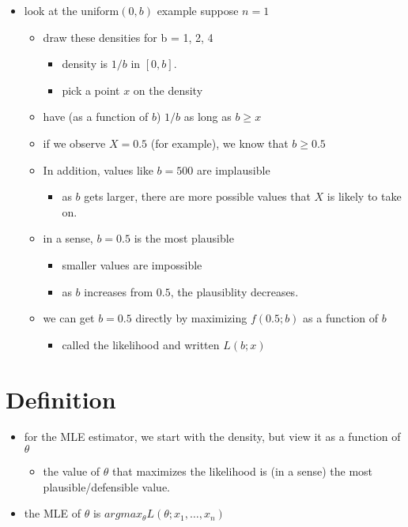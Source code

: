 \begin{itemize}
\item look at the uniform$(0,b)$ example suppose $n = 1$
\begin{itemize}
\item draw these densities for b = 1, 2, 4
\begin{itemize}
\item density is $1/b$ in $[0,b]$.
\item pick a point $x$ on the density
\end{itemize}
\item have (as a function of $b$) $1/b$ as long as $b \geq x$
\item if we observe $X = 0.5$ (for example), we know that $b \geq 0.5$
\item In addition, values like $b = 500$ are implausible
\begin{itemize}
\item as $b$ gets larger, there are more possible values that $X$ is
         likely to take on.
\end{itemize}
\item in a sense, $b = 0.5$ is the most plausible
\begin{itemize}
\item smaller values are impossible
\item as $b$ increases from $0.5$, the plausiblity decreases.
\end{itemize}
\item we can get $b = 0.5$ directly by maximizing $f(0.5; b)$ as a
       function of $b$
\begin{itemize}
\item called the likelihood and written $L(b; x)$
\end{itemize}
\end{itemize}
\end{itemize}
\section{Definition}
\label{sec-2}

\begin{itemize}
\item for the MLE estimator, we start with the density, but view it as a
     function of $\theta$
\begin{itemize}
\item the value of $\theta$ that maximizes the likelihood is (in a sense) the most plausible/defensible value.
\end{itemize}
\item the MLE of $\theta$ is $argmax_\theta L(\theta; x_1,\dots,x_n)$
\end{itemize}
